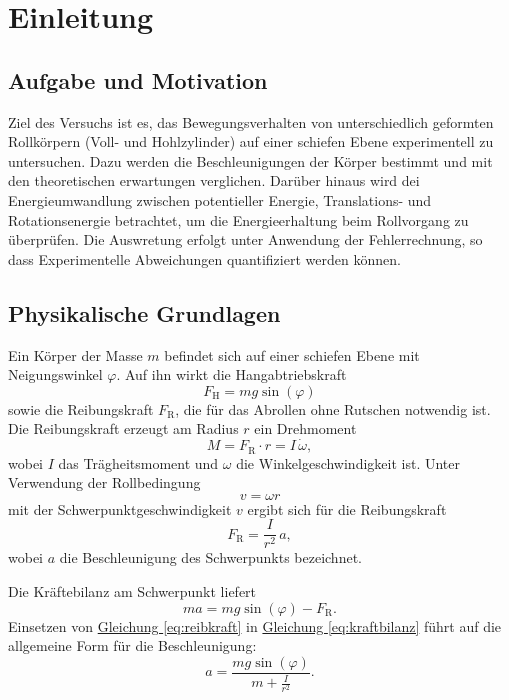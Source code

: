 \chapter{Einleitung}

\section{Aufgabe und Motivation}
Ziel des Versuchs ist es, das Bewegungsverhalten von unterschiedlich geformten Rollkörpern
(Voll- und Hohlzylinder) auf einer schiefen Ebene experimentell zu untersuchen. 
Dazu werden die Beschleunigungen der Körper bestimmt und mit den theoretischen erwartungen 
verglichen. Darüber hinaus wird dei Energieumwandlung zwischen potentieller Energie, 
Translations- und Rotationsenergie betrachtet, um die Energieerhaltung beim Rollvorgang zu überprüfen.  
Die Auswretung erfolgt unter Anwendung der Fehlerrechnung, so dass Experimentelle Abweichungen
quantifiziert werden können.

\section{Physikalische Grundlagen}
\cite{skript25}
Ein Körper der Masse $m$ befindet sich auf einer schiefen Ebene mit Neigungswinkel $\varphi$. 
Auf ihn wirkt die Hangabtriebskraft
\begin{equation}
    F_\text{H} = m g \sin(\varphi)
    \label{eq:hangabtrieb}
\end{equation}
sowie die Reibungskraft $F_\text{R}$, die für das Abrollen ohne Rutschen notwendig ist.  
Die Reibungskraft erzeugt am Radius $r$ ein Drehmoment
\begin{equation}
    M = F_\text{R} \cdot r = I \, \dot{\omega},
    \label{eq:drehmoment}
\end{equation}
wobei $I$ das Trägheitsmoment und $\omega$ die Winkelgeschwindigkeit ist.  
Unter Verwendung der Rollbedingung
\begin{equation}
    v = \omega r
    \label{eq:rollbedingung}
\end{equation}
mit der Schwerpunktgeschwindigkeit $v$ ergibt sich für die Reibungskraft
\begin{equation}
    F_\text{R} = \frac{I}{r^2} \, a,
    \label{eq:reibkraft}
\end{equation}
wobei $a$ die Beschleunigung des Schwerpunkts bezeichnet.  

Die Kräftebilanz am Schwerpunkt liefert
\begin{equation}
    m a = m g \sin(\varphi) - F_\text{R}.
    \label{eq:kraftbilanz}
\end{equation}
Einsetzen von \hyperref[eq:reibkraft]{Gleichung \ref*{eq:reibkraft}} in 
\hyperref[eq:kraftbilanz]{Gleichung \ref*{eq:kraftbilanz}} führt auf die allgemeine Form für die Beschleunigung:
\begin{equation}
    a = \frac{m g \sin(\varphi)}{m + \frac{I}{r^2}}.
    \label{eq:beschleunigung}
\end{equation}

